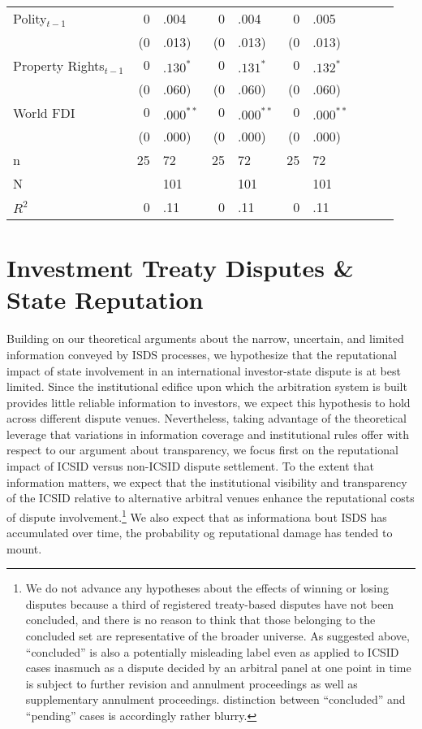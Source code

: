 \documentclass[12pt,onesided]{amsart}
\begin{document}
\begin{table}[ht]
{\begin{tabular}{lr@{} lr@{}lr@{}lr@{}lr@{}}
  Polity$_{t-1}$ & 0&.004 & 0&.004 & 0&.005 \\ 
   & (0&.013) & (0&.013) & (0&.013) \\ 
  Property Rights$_{t-1}$ & $0$&$.130^{\ast}$ & $0$&$.131^{\ast}$ & $0$&$.132^{\ast}$ \\ 
   & (0&.060) & (0&.060) & (0&.060) \\ 
  World FDI & $0$&$.000^{\ast\ast}$ & $0$&$.000^{\ast\ast}$ & $0$&$.000^{\ast\ast}$ \\ 
   & (0&.000) & (0&.000) & (0&.000) \\ 
   \hline
n & 25&72 & 25&72 & 25&72 \\ 
  N && 101 && 101 && 101 \\ 
  $R^{2}$ & 0&.11 & 0&.11 & 0&.11 \\ 
   \hline
\hline
\end{tabular}
}
\end{table}

\section*{Investment Treaty Disputes \& State Reputation}

Building on our theoretical arguments about the narrow, uncertain, and limited information conveyed by ISDS processes, we hypothesize that the reputational impact of state involvement in an international investor-state dispute is at best limited. Since the institutional edifice upon which the arbitration system is built provides little reliable information to investors, we expect this hypothesis to hold across different dispute venues. Nevertheless, taking advantage of the theoretical leverage that variations in information coverage and institutional rules offer with respect to our argument about transparency, we focus first on the reputational impact of ICSID versus non-ICSID dispute settlement. To the extent that information matters, we expect that the institutional visibility and transparency of the ICSID relative to alternative arbitral venues enhance the reputational costs of dispute involvement.\footnote{We do not advance any hypotheses about the effects of winning or losing disputes because a third of registered treaty-based disputes have not been concluded, and there is no reason to think that those belonging to the concluded set are representative of the broader universe. As suggested above, ``concluded'' is also a potentially misleading label even as applied to ICSID cases inasmuch as a dispute decided by an arbitral panel at one point in time is subject to further revision and annulment proceedings as well as supplementary annulment proceedings. distinction between ``concluded'' and ``pending'' cases is accordingly rather blurry.} We also expect that as informationa bout ISDS has accumulated over time, the probability og reputational damage has tended to mount.
\end{document}
